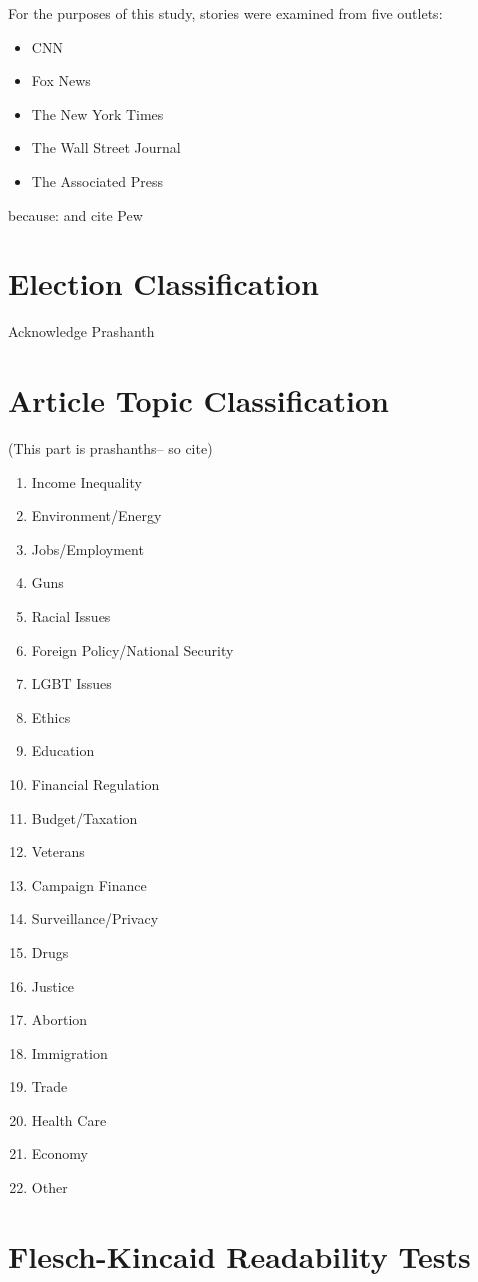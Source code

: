 For the purposes of this study, stories were examined from five outlets: 

\begin{itemize}
  \item CNN
  \item Fox News  
  \item The New York Times
  \item The Wall Street Journal
  \item The Associated Press 
\end{itemize}

because:   
and cite Pew

\section{Election Classification}

Acknowledge Prashanth

\section{Article Topic Classification}
(This part is prashanths-- so cite)
 


\begin{enumerate}
  \item Income Inequality
  \item Environment/Energy
  \item Jobs/Employment
  \item Guns
  \item Racial Issues
  \item Foreign Policy/National Security
  \item LGBT Issues
  \item Ethics
  \item Education
  \item Financial Regulation
  \item Budget/Taxation
  \item Veterans
  \item Campaign Finance
  \item Surveillance/Privacy
  \item Drugs
  \item Justice
  \item Abortion
  \item Immigration
  \item Trade
  \item Health Care
  \item Economy
  \item Other 
\end{enumerate}
 


\section{Flesch-Kincaid Readability Tests} 

















